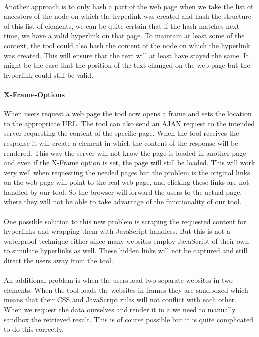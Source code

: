 	\paragraph{}
	Another approach is to only hash a part of the web page when we take the list of ancestors of the node on which the hyperlink was created and hash the structure of this list of elements, we can be quite certain that if the hash matches next time, we have a valid hyperlink on that page. To maintain at least some of the context, the tool could also hash the content of the node on which the hyperlink was created. This will ensure that the text will at least have stayed the same. It might be the case that the position of the text changed on the web page but the hyperlink could still be valid.
	\paragraph{X-Frame-Options}
	When users request a web page the tool now opens a frame and sets the location to the appropriate URL. The tool can also send an AJAX request to the intended server requesting the content of the specific page. When the tool receives the response it will create a  element in which the content of the response will be rendered. This way the server will not know the page is loaded in another page and even if the X-Frame option is set, the page will still be loaded. This will work very well when requesting the needed pages but the problem is the original links on the web page will point to the real web page, and clicking these links are not handled by our tool. So the browser will forward the users to the actual page, where they will not be able to take advantage of the functionality of our tool.
	\paragraph{}
	One possible solution to this new problem is scraping the requested content for hyperlinks and wrapping them with JavaScript  handlers. But this is not a waterproof technique either since many websites employ JavaScript of their own to simulate hyperlinks as well. These hidden links will not be captured and still direct the users away from the tool.
	\paragraph{}
	An additional problem is when the users load two separate websites in two  elements. When the tool loads the websites in frames they are sandboxed which means that their CSS and JavaScript rules will not conflict with each other. When we request the data ourselves and render it in a  we need to manually sandbox the retrieved result. This is of course possible but it is quite complicated to do this correctly.
